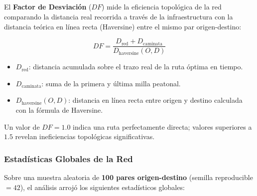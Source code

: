 \subsection{}
\label{subsec:detour-factor}

El \textbf{Factor de Desviación} ($DF$) mide la eficiencia topológica de la red
comparando la distancia real recorrida a través de la infraestructura con la
distancia teórica en línea recta (Haversine) entre el mismo par origen-destino:

\begin{equation}
    DF = \frac{D_{\text{red}} + D_{\text{caminata}}}{D_{\text{haversine}}(O, D)}
    \label{eq:detour-factor-res}
\end{equation}

\begin{itemize}
    \item $D_{\text{red}}$: distancia acumulada sobre el trazo real de la ruta
    óptima en tiempo.
    \item $D_{\text{caminata}}$: suma de la primera y última milla peatonal.
    \item $D_{\text{haversine}}(O,D)$: distancia en línea recta entre origen y
    destino calculada con la fórmula de Haversine.
\end{itemize}

Un valor de $DF = 1.0$ indica una ruta perfectamente directa; valores superiores
a $1.5$ revelan ineficiencias topológicas significativas.

\subsubsection{Estadísticas Globales de la Red}
\label{subsubsec:df-estadisticas}

Sobre una muestra aleatoria de \textbf{100 pares origen-destino} (semilla
reproducible $= 42$), el análisis arrojó los siguientes estadísticos globales:

